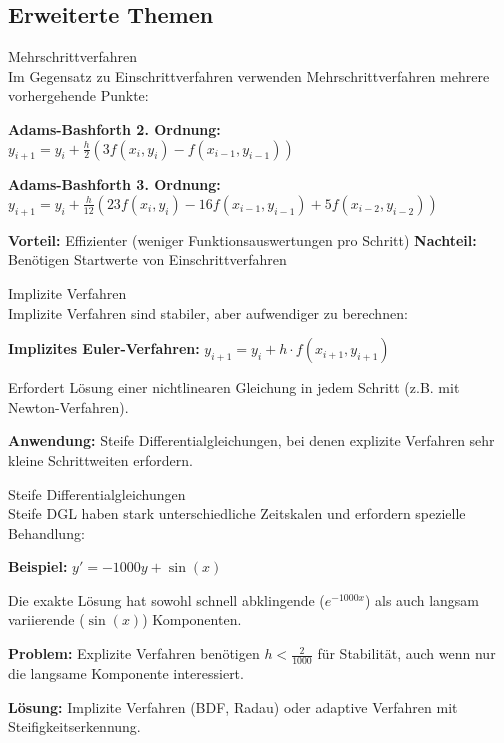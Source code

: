 \subsection{Erweiterte Themen}

\begin{concept}{Mehrschrittverfahren}\\
Im Gegensatz zu Einschrittverfahren verwenden Mehrschrittverfahren mehrere vorhergehende Punkte:

\textbf{Adams-Bashforth 2. Ordnung:}
$y_{i+1} = y_i + \frac{h}{2}(3f(x_i, y_i) - f(x_{i-1}, y_{i-1}))$

\textbf{Adams-Bashforth 3. Ordnung:}
$y_{i+1} = y_i + \frac{h}{12}(23f(x_i, y_i) - 16f(x_{i-1}, y_{i-1}) + 5f(x_{i-2}, y_{i-2}))$

\textbf{Vorteil:} Effizienter (weniger Funktionsauswertungen pro Schritt)
\textbf{Nachteil:} Benötigen Startwerte von Einschrittverfahren
\end{concept}

\begin{concept}{Implizite Verfahren}\\
Implizite Verfahren sind stabiler, aber aufwendiger zu berechnen:

\textbf{Implizites Euler-Verfahren:}
$y_{i+1} = y_i + h \cdot f(x_{i+1}, y_{i+1})$

Erfordert Lösung einer nichtlinearen Gleichung in jedem Schritt (z.B. mit Newton-Verfahren).

\textbf{Anwendung:} Steife Differentialgleichungen, bei denen explizite Verfahren sehr kleine Schrittweiten erfordern.
\end{concept}

\begin{concept}{Steife Differentialgleichungen}\\
Steife DGL haben stark unterschiedliche Zeitskalen und erfordern spezielle Behandlung:

\textbf{Beispiel:} $y' = -1000y + \sin(x)$

Die exakte Lösung hat sowohl schnell abklingende ($e^{-1000x}$) als auch langsam variierende ($\sin(x)$) Komponenten.

\textbf{Problem:} Explizite Verfahren benötigen $h < \frac{2}{1000}$ für Stabilität, auch wenn nur die langsame Komponente interessiert.

\textbf{Lösung:} Implizite Verfahren (BDF, Radau) oder adaptive Verfahren mit Steifigkeitserkennung.
\end{concept}

